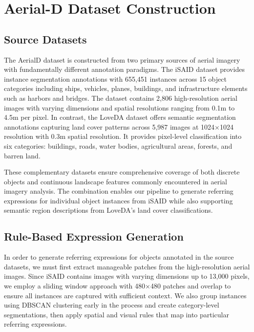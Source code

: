 
\section{Aerial-D Dataset Construction}
\label{sec:approach}

\subsection{Source Datasets}

The AerialD dataset is constructed from two primary sources of aerial imagery with fundamentally different annotation paradigms. The iSAID dataset provides instance segmentation annotations with 655,451 instances across 15 object categories including ships, vehicles, planes, buildings, and infrastructure elements such as harbors and bridges. The dataset contains 2,806 high-resolution aerial images with varying dimensions and spatial resolutions ranging from 0.1m to 4.5m per pixel. In contrast, the LoveDA dataset offers semantic segmentation annotations capturing land cover patterns across 5,987 images at 1024×1024 resolution with 0.3m spatial resolution. It provides pixel-level classification into six categories: buildings, roads, water bodies, agricultural areas, forests, and barren land.

These complementary datasets ensure comprehensive coverage of both discrete objects and continuous landscape features commonly encountered in aerial imagery analysis. The combination enables our pipeline to generate referring expressions for individual object instances from iSAID while also supporting semantic region descriptions from LoveDA's land cover classifications.

\subsection{Rule-Based Expression Generation}

In order to generate referring expressions for objects annotated in the source datasets, we must first extract manageable patches from the high-resolution aerial images. Since iSAID contains images with varying dimensions up to 13,000 pixels, we employ a sliding window approach with 480×480 patches and overlap to ensure all instances are captured with sufficient context. We also group instances using DBSCAN clustering early in the process and create category-level segmentations, then apply spatial and visual rules that map into particular referring expressions.

